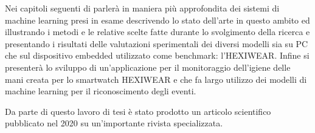Nei capitoli seguenti di parlerà in maniera più approfondita dei sistemi di machine learning presi in esame descrivendo lo stato dell'arte in questo ambito ed illustrando i metodi e le relative scelte fatte durante lo svolgimento della ricerca e presentando i risultati delle valutazioni sperimentali dei diversi modelli sia su PC che sul dispositivo embedded utilizzato come benchmark: l'HEXIWEAR. Infine si presenterà lo sviluppo di un'applicazione per il monitoraggio dell'igiene delle mani creata per lo smartwatch HEXIWEAR e che fa largo utilizzo dei modelli di machine learning per il riconoscimento degli eventi.

Da parte di questo lavoro di tesi è stato prodotto un articolo scientifico pubblicato nel 2020 su un'importante rivista specializzata\cite{lattanzi2022unstructured}.
